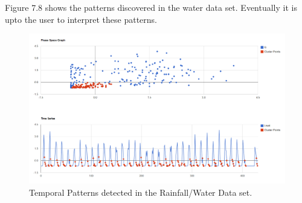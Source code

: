 \documentclass[12pt,a4paper]{report}
\begin{document}
Figure 7.8 shows the patterns discovered in the water data set. Eventually it is upto the user to interpret these patterns.
\begin{figure}[h!]

  \centering
    \includegraphics[scale=0.35]{./screenshots/result_tmp_pattern.png}
  \caption{Temporal Patterns detected in the Rainfall/Water Data set.}
\end{figure}
\end{document}
